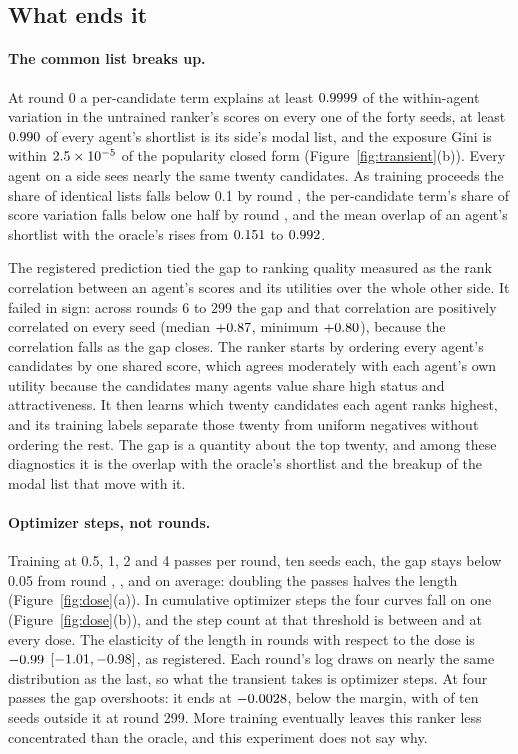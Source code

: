 \subsection{What ends it}
\label{sec:what-ends}

\paragraph{The common list breaks up.} At round 0 a per-candidate term explains at
least $0.9999$ of the within-agent variation in the untrained ranker's
scores on every one of the forty seeds, at least $0.990$ of every
agent's shortlist is its side's modal list, and the exposure Gini is within
$2.5\times 10^{-5}$ of the popularity closed form (Figure~\ref{fig:transient}(b)).
Every agent on a side sees nearly the same twenty candidates. As training proceeds
the share of identical lists falls below 0.1 by round \identicalBelowRound{}, the
per-candidate term's share of score variation falls below one half by round
\itemBelowRound{}, and the mean overlap of an agent's shortlist with the oracle's
rises from $0.151$ to $0.992$.

The registered prediction tied the gap to ranking quality measured as the rank
correlation between an agent's scores and its utilities over the whole other
side. It failed in sign: across rounds 6 to 299 the gap and that correlation are
positively correlated on every seed (median $+0.87$, minimum $+0.80$),
because the correlation falls as the gap closes. The ranker starts by ordering
every agent's candidates by one shared score, which agrees moderately with each
agent's own utility because the candidates many agents value share high status
and attractiveness. It then learns which twenty candidates each agent ranks
highest, and its training labels separate those twenty from uniform negatives
without ordering the rest. The gap is a quantity about the top twenty, and among
these diagnostics it is the overlap with the oracle's shortlist and the breakup of
the modal list that move with it.

\paragraph{Optimizer steps, not rounds.} Training at 0.5, 1, 2 and 4 passes per
round, ten seeds each, the gap stays below 0.05 from round \TfiveDoseHalf{},
\TfiveDoseOne{}, \TfiveDoseTwo{} and \TfiveDoseFour{} on average: doubling the
passes halves the length (Figure~\ref{fig:dose}(a)). In cumulative optimizer
steps the four curves fall on one (Figure~\ref{fig:dose}(b)), and the step count
at that threshold is between \stepsTfiveMin{} and \stepsTfiveMax{} at every dose.
The elasticity of the length in rounds with respect to the dose is
$-0.99$ $[-1.01, -0.98]$, as registered. Each
round's log draws on nearly the same distribution as the last, so what the
transient takes is optimizer steps. At four passes the gap overshoots: it ends at
$-0.0028$, below the margin, with \doseFourCensored{} of ten seeds outside
it at round 299. More training eventually leaves this ranker less concentrated
than the oracle, and this experiment does not say why.

